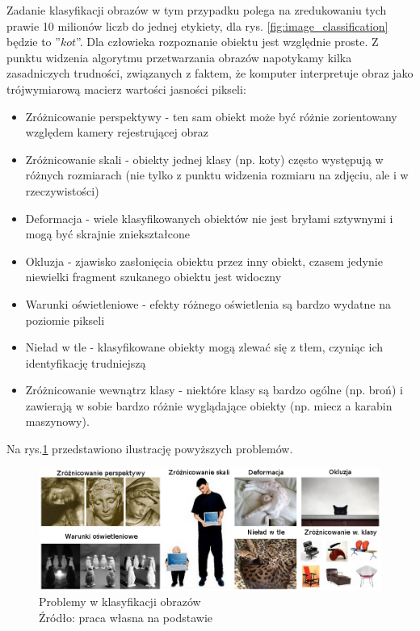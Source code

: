 Zadanie klasyfikacji obrazów w tym przypadku polega na zredukowaniu tych prawie 10 milionów liczb do jednej etykiety, dla rys. \ref{fig:image_classification} będzie to ''$kot$''.
Dla człowieka rozpoznanie obiektu jest względnie proste. Z punktu widzenia algorytmu przetwarzania obrazów napotykamy kilka zasadniczych trudności, związanych z faktem, że komputer interpretuje obraz jako trójwymiarową macierz wartości jasności pikseli:
\begin{itemize}
	\item Zróżnicowanie perspektywy - ten sam obiekt może być różnie zorientowany względem kamery rejestrującej obraz
	\item Zróżnicowanie skali - obiekty jednej klasy (np. koty) często występują w różnych rozmiarach (nie tylko z punktu widzenia rozmiaru na zdjęciu, ale i w rzeczywistości)
	\item Deformacja - wiele klasyfikowanych obiektów nie jest bryłami sztywnymi i mogą być skrajnie zniekształcone
	\item Okluzja - zjawisko zasłonięcia obiektu przez inny obiekt, czasem jedynie niewielki fragment szukanego obiektu jest widoczny
	\item Warunki oświetleniowe - efekty różnego oświetlenia są bardzo wydatne na poziomie pikseli
	\item Nieład w tle - klasyfikowane obiekty mogą zlewać się z tłem, czyniąc ich identyfikację trudniejszą
	\item Zróżnicowanie wewnątrz klasy - niektóre klasy są bardzo ogólne (np. broń) i zawierają w sobie bardzo różnie wyglądające obiekty (np. miecz a karabin maszynowy).
\end{itemize}
Na rys.\ref{fig:classification_problems} przedstawiono ilustrację powyższych problemów.

\begin{figure}[h!tb]
	 \centering
	 \includegraphics[width = 1.0\linewidth]{img/klas_problemy}
	 \caption{Problemy w klasyfikacji obrazów \\
              Źródło: praca własna na podstawie \cite{cs231n}}
	 \label{fig:classification_problems}
\end{figure}


